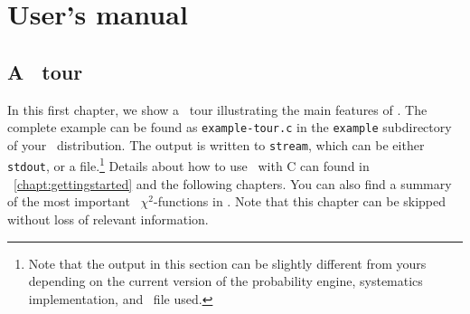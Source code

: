 
\part{User's manual}
\label{part:1}

\chapter{A \GLOBES\ tour}
\label{chapter:tour}

In this first chapter, we show a \GLOBES\ tour illustrating the
main features of \GLOBES . The complete example  
can be found as {\tt example-tour.c} in the \verb+example+ subdirectory 
of your \GLOBES\ distribution.
The output is written to {\tt stream}, which can be either {\tt stdout},
or a file.\footnote{Note that the output in this section can be slightly
different from yours depending on the current version of the 
probability engine, systematics implementation, and \AEDL\ file used.}
Details about how to use \GLOBES\ with C can found in \Chapt~\ref{chapt:gettingstarted} and the following chapters.
You can also find a summary of the most important \GLOBES\ $\chi^2$-functions in . Note that this chapter
can be skipped without loss of relevant information.

